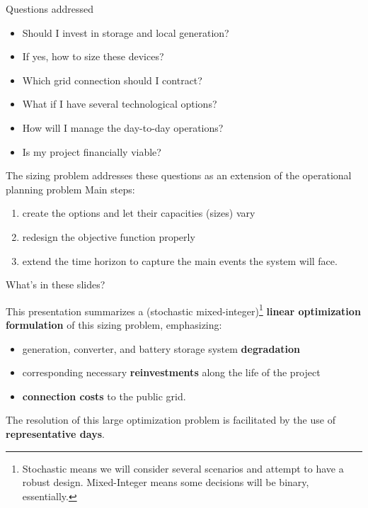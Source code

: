 \titleframe





\begin{frame}{Questions addressed}

    \begin{itemize}
      \item Should I invest in storage and local generation?
      \item If yes, how to size these devices?
      \item Which grid connection should I contract?
      \item What if I have several technological options?
      \item How will I manage the day-to-day operations?
      \item Is my project financially viable?
    \end{itemize}
\end{frame}

\begin{frame}{The sizing problem addresses these questions as an extension of the operational planning problem}
    Main steps: 
    \begin{enumerate}
      \item create the options and let their capacities (sizes) vary
      \item redesign the objective function properly
      \item extend the time horizon to capture the main events the system will face.
    \end{enumerate}
\end{frame}

\begin{frame}{What's in these slides?}

    This presentation summarizes a (stochastic mixed-integer)\footnote{Stochastic means we will consider several scenarios and attempt to have a robust design. Mixed-Integer means some decisions will be binary, essentially.} \textbf{linear optimization formulation} of this sizing problem, emphasizing:
    \begin{itemize}
        \item generation, converter, and battery storage system \textbf{degradation}
        \item corresponding necessary \textbf{reinvestments} along the life of the project
        \item \textbf{connection costs} to the public grid.
    \end{itemize}
    
    The resolution of this large optimization problem is facilitated by the use of \textbf{representative days}. 
    
\end{frame}

